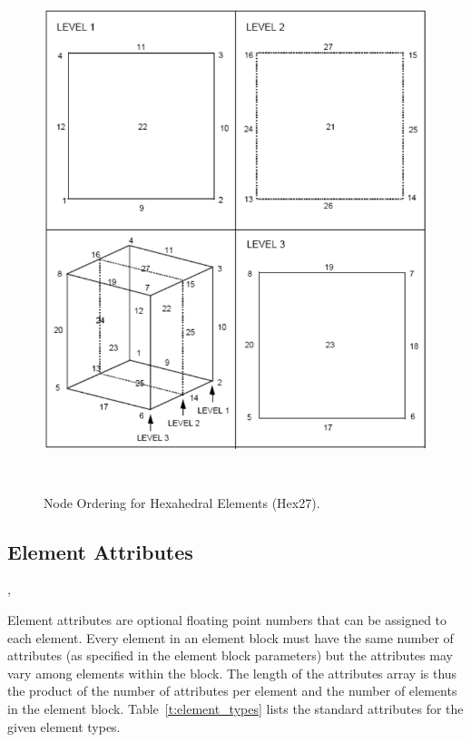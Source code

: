 \begin{figure}
\begin{center}
\includegraphics[width=6.000in, height=6.000in]{topology/hex27.png}
\caption{Node Ordering for Hexahedral Elements (Hex27).}\label{topology:hex27}
\end{center}
\end{figure}


\subsection{Element Attributes}

\begin{spacing}{1.5}
\api {}, 
\end{spacing}

{Element attributes are optional floating point numbers that can be
assigned to each element. Every element in an element block must have
the same number of attributes (as specified in the element block
parameters) but the attributes may vary among elements within the
block. The length of the attributes array is thus the product of the
number of attributes per element and the number of elements in the
element block.  Table~\ref{t:element_types} lists the standard
attributes for the given element types. }


